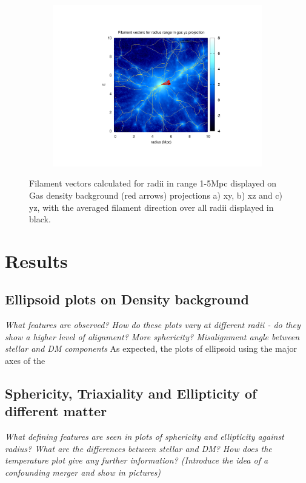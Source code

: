 \documentclass[journal]{IEEEtran}
\begin{document}
\begin{figure}[!t]
\begin{subfigure}[t]{0.3\textwidth}
		\includegraphics[width=\linewidth]{Filyz.pdf}
	\end{subfigure}
\label{fil_calc}
	\caption{Filament vectors calculated for radii in range 1-5Mpc displayed on Gas density background (red arrows) projections a) xy, b) xz and c) yz, with the averaged filament direction over all radii displayed in black.}
\end{figure}

\section{Results}
\subsection{Ellipsoid plots on Density background}
\textit{What features are observed? How do these plots vary at different radii - do they show a higher level of alignment? More sphericity? 
Misalignment angle between stellar and DM components}
As expected, the plots of ellipsoid using the major axes of the 

\subsection{Sphericity, Triaxiality and Ellipticity of different matter}
\textit{What defining features are seen in plots of sphericity and ellipticity against radius? What are the differences between stellar and DM? How does the temperature plot give any further information?
(Introduce the idea of a confounding merger and show in pictures)}
\end{document}
